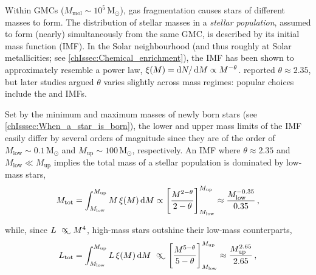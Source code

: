 Within GMCs ($M_\text{mol} \sim 10^{5} \, \mathrm{M_\odot}$), gas fragmentation causes stars of different masses to form. The distribution of stellar masses in a \textit{stellar population}, assumed to form (nearly) simultaneously from the same GMC, is described by its initial mass function (IMF). In the Solar neighbourhood (and thus roughly at Solar metallicities; see \cref{chIssec:Chemical_enrichment}), the IMF has been shown to approximately resemble a power law, $\xi (M) = \dif N/\dif M \propto M^{-\theta}$. \citet{1955ApJ...121..161S} reported $\theta \approx 2.35$, but later studies argued $\theta$ varies slightly across mass regimes: popular choices include the \citet{2001MNRAS.322..231K} and \citet{2003PASP..115..763C} IMFs.

Set by the minimum and maximum masses of newly born stars (see \cref{chIsssec:When_a_star_is_born}), the lower and upper mass limits of the IMF easily differ by several orders of magnitude since they are of the order of $M_\text{low} \sim 0.1 \, \mathrm{M_\odot}$ and $M_\text{up} \sim 100 \, \mathrm{M_\odot}$, respectively. An IMF where $\theta \approx 2.35$ and $M_\text{low} \ll M_\text{up}$ implies the total mass of a stellar population is dominated by low-mass stars,
\begin{equation}
    \label{chIeq:IMF_mass}
    M_\text{tot} = \int_{M_\text{low}}^{M_\text{up}} M \, \xi (M) \dif M \propto \left[ \frac{M^{2-\theta}}{2-\theta} \right]_{M_\text{low}}^{M_\text{up}} \approx \frac{M_\text{low}^{-0.35}}{0.35} \, ,
\end{equation}

\noindent while, since $L \appropto M^4$, high-mass stars outshine their low-mass counterparts,
\begin{equation}
    \label{chIeq:IMF_luminosity}
    L_\text{tot} = \int_{M_\text{low}}^{M_\text{up}} L \, \xi (M) \dif M \appropto \left[ \frac{M^{5-\theta}}{5-\theta} \right]_{M_\text{low}}^{M_\text{up}} \approx \frac{M_\text{up}^{2.65}}{2.65} \, ,
\end{equation}

